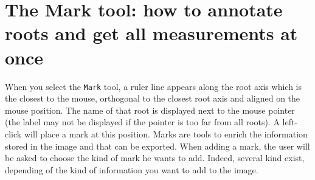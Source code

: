 \documentclass[a4paper,english,10pt]{report}
\begin{document}
% 
% 


\newpage
{\color{coolSection}\section[The Mark tool]{The Mark tool: how to annotate roots and get all measurements at once}}
\label{chapmark}

When you select the \verb|Mark| tool, a ruler line appears along the root axis which is the closest to the mouse, orthogonal to the closest root axis and aligned on the mouse position. The name of that root is displayed next to the mouse pointer (the label may not be displayed if the pointer is too far from all roots). A left-click will place a mark at this position. Marks are tools to enrich the information stored in the image and that can be exported. When adding a mark, the user will be asked to choose the kind of mark he wants to add. Indeed, several kind exist, depending of the kind of information you want to add to the image.\\
\end{document}
